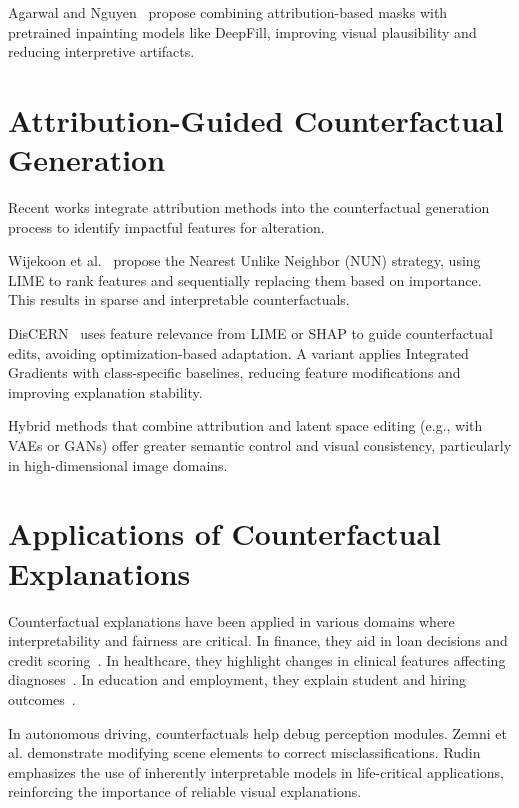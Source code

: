 Agarwal and Nguyen~\cite{agarwal2020explainingimageclassifiersremoving} propose combining attribution-based masks with pretrained inpainting models like DeepFill, improving visual plausibility and reducing interpretive artifacts.

\section{Attribution-Guided Counterfactual Generation}
Recent works integrate attribution methods into the counterfactual generation process to identify impactful features for alteration.

Wijekoon et al.~\cite{WijekoonWNMPC21} propose the Nearest Unlike Neighbor (NUN) strategy, using LIME to rank features and sequentially replacing them based on importance. This results in sparse and interpretable counterfactuals.

DisCERN~\cite{wiratunga2021discerndiscoveringcounterfactualexplanationsusing} uses feature relevance from LIME or SHAP to guide counterfactual edits, avoiding optimization-based adaptation. A variant applies Integrated Gradients with class-specific baselines, reducing feature modifications and improving explanation stability.

Hybrid methods that combine attribution and latent space editing (e.g., with VAEs or GANs) offer greater semantic control and visual consistency, particularly in high-dimensional image domains.

\section{Applications of Counterfactual Explanations}
Counterfactual explanations have been applied in various domains where interpretability and fairness are critical. In finance, they aid in loan decisions and credit scoring~\cite{guidotti2022counterfactual, DELANEY2023103995}. In healthcare, they highlight changes in clinical features affecting diagnoses~\cite{10.1145/3351095.3372855}. In education and employment, they explain student and hiring outcomes~\cite{WijekoonWNMPC21}.

In autonomous driving, counterfactuals help debug perception modules. Zemni et al.\cite{zemni2023octetobjectawarecounterfactualexplanations} demonstrate modifying scene elements to correct misclassifications. Rudin\cite{Rudin2019} emphasizes the use of inherently interpretable models in life-critical applications, reinforcing the importance of reliable visual explanations.

